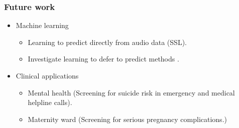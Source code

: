 \begin{frame}
    \frametitle{Future work}
    \begin{itemize}
        \item <1-> Machine learning
        \begin{itemize}
            \item <1-> Learning to predict directly from audio data (SSL).
            \item <1-> Investigate learning to defer to predict methods \cite{verma_calibrated_2022}.
        \end{itemize}
        \item <2-> Clinical applications
        \begin{itemize}
            \item <2-> Mental health (Screening for suicide risk in emergency and medical helpline calls).
            \item <2-> Maternity ward (Screening for serious pregnancy complications.)
        \end{itemize}
    \end{itemize}
\end{frame}
